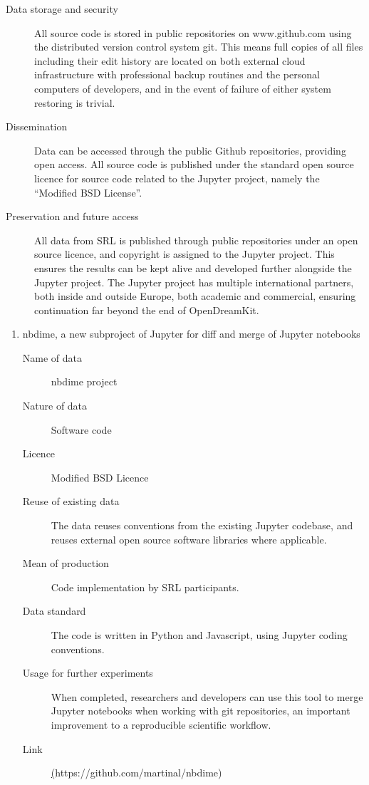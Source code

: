 \documentclass[12pt]{article}
\begin{document}
\begin{description}
\item[Data storage and security] All source code is stored in public
  repositories on www.github.com using the distributed version control
  system git. This means full copies of all files including their edit
  history are located on both external cloud infrastructure with
  professional backup routines and the personal computers of
  developers, and in the event of failure of either system restoring
  is trivial.

\item[Dissemination] Data can be accessed through the public Github
  repositories, providing open access. All source code is published
  under the standard open source licence for source code related to
  the Jupyter project, namely the ``Modified BSD License''.

\item[Preservation and future access] All data from SRL is published
  through public repositories under an open source licence, and
  copyright is assigned to the Jupyter project. This ensures the
  results can be kept alive and developed further alongside the
  Jupyter project. The Jupyter project has multiple international
  partners, both inside and outside Europe, both academic and
  commercial, ensuring continuation far beyond the end of
  OpenDreamKit.

\end{description}

\begin{enumerate}

  \item nbdime, a new subproject of Jupyter for diff and merge of Jupyter notebooks
    \begin{description}
    \item[Name of data] nbdime project
    \item[Nature of data] Software code
    \item[Licence] Modified BSD Licence
    \item[Reuse of existing data] The data reuses conventions from the
      existing Jupyter codebase, and reuses external open source
      software libraries where applicable.
    \item[Mean of production] Code implementation by SRL participants.
    \item[Data standard] The code is written in Python and Javascript, using Jupyter coding conventions.
    \item [Usage for further experiments] When completed, researchers
      and developers can use this tool to merge Jupyter notebooks
      when working with git repositories, an important improvement to
      a reproducible scientific workflow.
    \item [Link] \href{https://github.com/martinal/nbdime}(https://github.com/martinal/nbdime)
    \end{description}

\end{enumerate}
\end{document}
